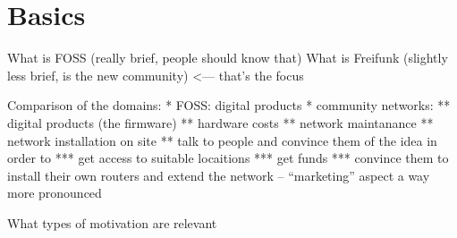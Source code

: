 \section{Basics}

What is FOSS (really brief, people should know that)
What is Freifunk (slightly less brief, is the new community) <--- that's the focus

Comparison of the domains:
* FOSS: digital products
* community networks:
  ** digital products (the firmware)
  ** hardware costs
  ** network maintanance
  ** network installation on site
  ** talk to people and convince them of the idea in order to
     *** get access to suitable locaitions
     *** get funds
     *** convince them to install their own routers and extend the network -- ``marketing'' aspect a way more pronounced

What types of motivation are relevant
